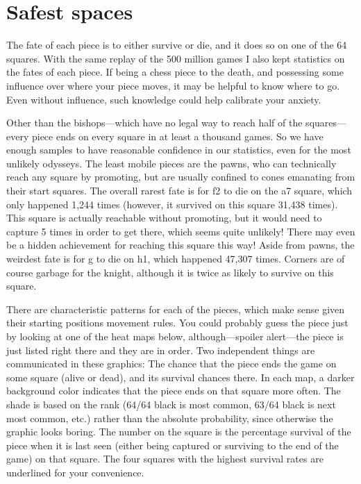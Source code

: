 \documentclass[twocolumn]{article}
\begin{document}
\section{Safest spaces}

The fate of each piece is to either survive or die, and it does so on
one of the 64 squares. With the same replay of the 500 million games
I also kept statistics on the fates of each piece. If being a chess
piece to the death, and possessing some influence over where your piece
moves, it may be helpful to know where to go. Even without influence,
such knowledge could help calibrate your anxiety.

Other than the bishops---which have no legal way to reach half of the
squares---every piece ends on every square in at least a thousand
games. So we have enough samples to have reasonable confidence in our
statistics, even for the most unlikely odysseys. The least mobile
pieces are the pawns, who can technically reach any square by
promoting, but are usually confined to cones emanating from their
start squares. The overall rarest fate is for \pawn f2 to die on the
a7 square, which only happened 1,244 times (however, it survived on
this square 31,438 times). This square is actually reachable without
promoting, but it would need to capture 5 times in order to get
there, which seems quite unlikely! There may even be a hidden
achievement for reaching this square this way!
Aside from pawns, the weirdest fate is for \knight g to die on h1,
which happened 47,307 times. Corners are of course garbage for the
knight, although it is twice as likely to survive on this square.

There are characteristic patterns for each of the pieces, which make
sense given their starting positions movement rules. You could
probably guess the piece just by looking at one of the heat maps
below, although---spoiler alert---the piece is just listed right there
and they are in order. Two independent things are communicated in
these graphics: The chance that the piece ends the game on some square
(alive or dead), and its survival chances there. In each map, a darker
background color indicates that the piece ends on that square more
often. The shade is based on the rank (64/64 black is most common,
63/64 black is next most common, etc.) rather than the absolute
probability, since otherwise the graphic looks boring. The number on
the square is the percentage survival of the piece when it is last
seen (either being captured or surviving to the end of the game) on
that square. The four squares with the highest survival rates are
underlined for your convenience.
\end{document}
